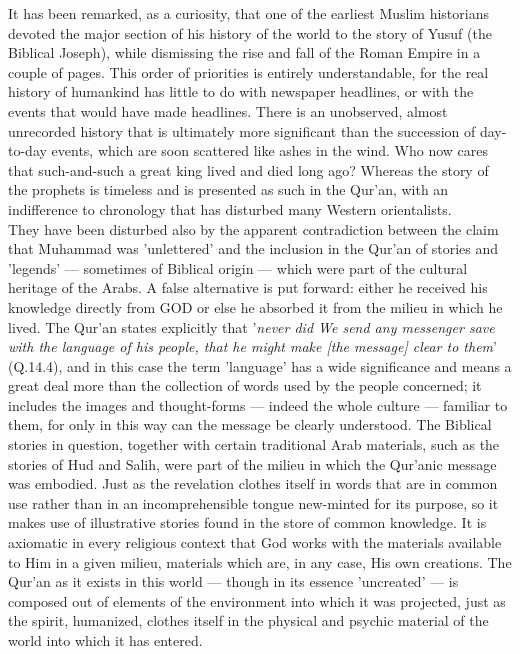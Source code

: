 \documentclass[10pt, twoside,openright]{book}
\begin{document}
It has been remarked, as a curiosity, that one of the earliest Muslim historians devoted the major 
section of his history of the world to the story of Yusuf (the Biblical Joseph), while dismissing the 
rise and fall of the Roman Empire in a couple of pages. This order of priorities is entirely 
understandable, for the real history of humankind has little to do with newspaper headlines, or with 
the events that would have made headlines. There is an unobserved, almost unrecorded history that is 
ultimately more significant than the succession of day\hyp{}to\hyp{}day events, which are soon scattered like 
ashes in the wind. Who now cares that such\hyp{}and\hyp{}such a great king lived and died long ago? Whereas the 
story of the prophets is timeless and is presented as such in the Qur'an, with an indifference to 
chronology that has disturbed many Western orientalists. \\

They have been disturbed also by the apparent contradiction between the claim that Muhammad was 
'unlettered' and the inclusion in the Qur'an of stories and 'legends' --- sometimes of Biblical origin 
--- which were part of the cultural heritage of the Arabs. A false alternative is put forward: either 
he received his knowledge directly from GOD or else he absorbed it from the milieu in which he lived. 
The Qur'an states explicitly that '\emph{never did We send any messenger save with the language of his 
people, that he might make [the message] clear to them}' (Q.14.4), and in this case the term 'language' 
has a wide significance and means a great deal more than the collection of words used by the people 
concerned; it includes the images and thought-forms --- indeed the whole culture --- familiar to them, 
for only in this way can the message be clearly understood. The Biblical stories in question, 
together with certain traditional Arab materials, such as the stories of Hud and Salih, were part of 
the milieu in which the Qur'anic message was embodied. Just as the revelation clothes itself in words 
that are in common use rather than in an incomprehensible tongue new\hyp{}minted for its purpose, so it 
makes use of illustrative stories found in the store of common knowledge. It is axiomatic in every 
religious context that God works with the materials available to Him in a given milieu, materials 
which are, in any case, His own creations. The Qur'an as it exists in this world --- though in its 
essence 'uncreated' --- is composed out of elements of the environment into which it was projected, 
just as the spirit, humanized, clothes itself in the physical and psychic material of the world into 
which it has entered. \\
\end{document}
